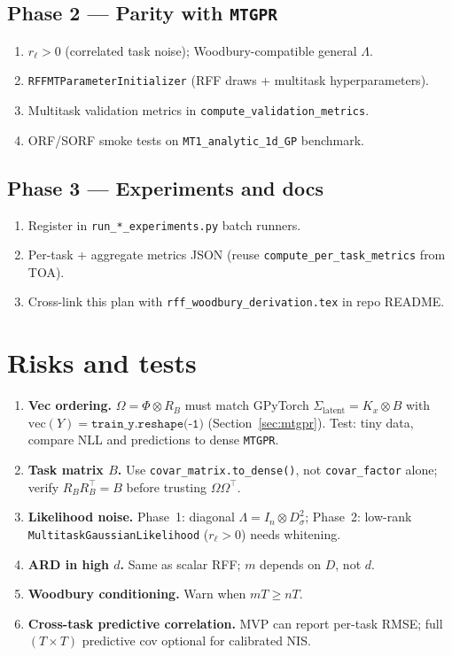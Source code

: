 \documentclass[11pt]{article}
\theoremstyle{plain}
\newcommand{\noise}{\sigma^2}
\newcommand{\Sig}{\Sigma}
\newcommand{\Ph}{\Phi}
\newcommand{\Om}{\Omega}
\newcommand{\RB}{R_B}
\begin{document}
\subsection{Phase 2 --- Parity with \texttt{MTGPR}}

\begin{enumerate}
  \item $r_\ell > 0$ (correlated task noise); Woodbury-compatible general $\Lambda$.
  \item \texttt{RFFMTParameterInitializer} (RFF draws + multitask hyperparameters).
  \item Multitask validation metrics in \texttt{compute\_validation\_metrics}.
  \item ORF/SORF smoke tests on \texttt{MT1\_analytic\_1d\_GP} benchmark.
\end{enumerate}

\subsection{Phase 3 --- Experiments and docs}

\begin{enumerate}
  \item Register in \texttt{run\_*\_experiments.py} batch runners.
  \item Per-task + aggregate metrics JSON (reuse \texttt{compute\_per\_task\_metrics} from TOA).
  \item Cross-link this plan with \texttt{rff\_woodbury\_derivation.tex} in repo README.
\end{enumerate}

\section{Risks and tests}

\begin{enumerate}
  \item \textbf{Vec ordering.} $\Om = \Ph \otimes \RB$ must match GPyTorch
        $\Sig_{\mathrm{latent}} = K_x \otimes B$ with $\mathrm{vec}(Y)=\texttt{train\_y.reshape(-1)}$
        (Section~\ref{sec:mtgpr}).
        Test: tiny data, compare NLL and predictions to dense \texttt{MTGPR}.
  \item \textbf{Task matrix $B$.} Use \texttt{covar\_matrix.to\_dense()}, not \texttt{covar\_factor}
        alone; verify $\RB\RB^\top = B$ before trusting $\Om\Om^\top$.
  \item \textbf{Likelihood noise.} Phase~1: diagonal $\Lambda = I_n \otimes D_\noise$;
        Phase~2: low-rank \texttt{MultitaskGaussianLikelihood} ($r_\ell > 0$) needs whitening.
  \item \textbf{ARD in high $d$.} Same as scalar RFF; $m$ depends on $D$, not $d$.
  \item \textbf{Woodbury conditioning.} Warn when $mT \ge nT$.
  \item \textbf{Cross-task predictive correlation.} MVP can report per-task RMSE;
        full $(T\times T)$ predictive cov optional for calibrated NIS.
\end{enumerate}
\end{document}
